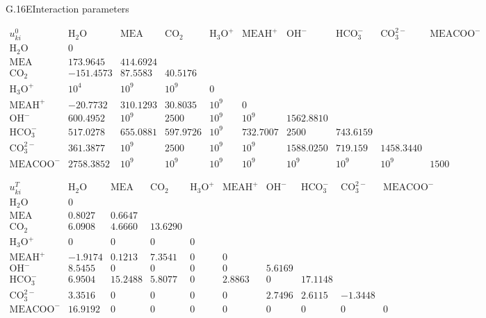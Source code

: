 \begin{eqcard}{G.16}{E}{Interaction parameters}
\begin{center}\footnotesize
$\begin{array}{l|rrrrrrrrr}u^0_{ki}&\mathrm{H_2O}&\mathrm{MEA}&\mathrm{CO_2}&\mathrm{H_3O^+}&\mathrm{MEAH^+}&\mathrm{OH^-}&\mathrm{HCO_3^-}&\mathrm{CO_3^{2-}}&\mathrm{MEACOO^-}\\\hline\mathrm{H_2O}&0\\\mathrm{MEA}&173.9645&414.6924\\\mathrm{CO_2}&-151.4573&87.5583&40.5176\\\mathrm{H_3O^+}&10^4&10^9&10^9&0\\\mathrm{MEAH^+}&-20.7732&310.1293&30.8035&10^9&0\\\mathrm{OH^-}&600.4952&10^9&2500&10^9&10^9&1562.8810\\\mathrm{HCO_3^-}&517.0278&655.0881&597.9726&10^9&732.7007&2500&743.6159\\\mathrm{CO_3^{2-}}&361.3877&10^9&2500&10^9&10^9&1588.0250&719.159&1458.3440\\\mathrm{MEACOO^-}&2758.3852&10^9&10^9&10^9&10^9&10^9&10^9&10^9&1500\end{array}$

\vspace{4pt}
$\begin{array}{l|rrrrrrrrr}u^T_{ki}&\mathrm{H_2O}&\mathrm{MEA}&\mathrm{CO_2}&\mathrm{H_3O^+}&\mathrm{MEAH^+}&\mathrm{OH^-}&\mathrm{HCO_3^-}&\mathrm{CO_3^{2-}}&\mathrm{MEACOO^-}\\\hline\mathrm{H_2O}&0\\\mathrm{MEA}&0.8027&0.6647\\\mathrm{CO_2}&6.0908&4.6660&13.6290\\\mathrm{H_3O^+}&0&0&0&0\\\mathrm{MEAH^+}&-1.9174&0.1213&7.3541&0&0\\\mathrm{OH^-}&8.5455&0&0&0&0&5.6169\\\mathrm{HCO_3^-}&6.9504&15.2488&5.8077&0&2.8863&0&17.1148\\\mathrm{CO_3^{2-}}&3.3516&0&0&0&0&2.7496&2.6115&-1.3448\\\mathrm{MEACOO^-}&16.9192&0&0&0&0&0&0&0&0\end{array}$
\end{center}
\end{eqcard}

